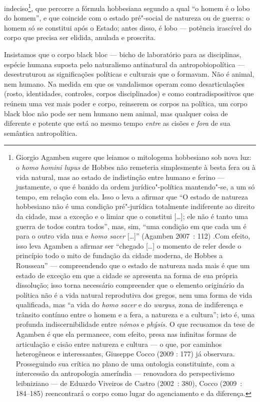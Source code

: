 indeciso\footnote{Giorgio Agamben sugere que leiamos o
  mitologema hobbesiano sob nova luz: o \emph{homo homini lupus} de
  Hobbes não remeteria simplesmente à besta fera ou à vida natural, mas
  ao estado de indistinção entre humano e ferino --- justamente, o que é
  banido da ordem jurídico"-política mantendo"-se, a um só tempo, em
  relação com ela. Isso o leva a afirmar que ``O estado de natureza
  hobbesiano não é uma condição pré"-jurídica totalmente indiferente ao
  direito da cidade, mas a exceção e o limiar que o constitui {[}\ldots{}{]};
  ele não é tanto uma guerra de todos contra todos'', mas, sim, ``uma
  condição em que cada um é para o outro vida nua e \emph{homo sacer
  }{[}\ldots{}{]}'' (Agamben 2007~: 112) .Com efeito, isso leva Agamben a
  afirmar ser ``chegado {[}\ldots{}{]} o momento de reler desde o princípio
  todo o mito de fundação da cidade moderna, de Hobbes a Rousseau'' ---
  compreendendo que o estado de natureza nada mais é que um estado de
  exceção em que a cidade se apresenta na forma de sua própria
  dissolução; isso torna necessário compreender que o elemento
  originário da política não é a vida natural reprodutiva dos gregos,
  nem uma forma de vida qualificada, mas ``a vida do \emph{homo sacer} e
  do \emph{wargus}, zona de indiferença e trânsito contínuo entre o
  homem e a fera, a natureza e a cultura''; isto é, uma profunda
  indiscernibilidade entre \emph{nómos} e \emph{phýsis.} O que recusamos
  da tese de Agamben é que ela permanece, com efeito, presa nas
  infinitas formas de articulação e cisão entre natureza e cultura --- o
  que, por caminhos heterogêneos e interessantes, Giuseppe Cocco (2009 :
  177) já observara. Prosseguindo sua crítica no plano de uma ontologia
  constituinte, com a intercessão da antropologia ameríndia ---
  renovadora do perspectivismo leibniziano --- de Eduardo Viveiros de
  Castro (2002~: 380), Cocco (2009~: 184--185) reencontrará o corpo como
  lugar do agenciamento e da diferença.}, que percorre a fórmula
hobbesiana segundo a qual ``o homem é o lobo do homem'', e que coincide
com o estado pré"-social de natureza ou de guerra: o homem só se
constitui após o Estado; antes disso, é lobo --- potência irascível do
corpo que precisa ser elidida, anulada e proscrita.

Insistamos que o corpo black bloc --- bicho de laboratório para as
disciplinas, espécie humana suposta pelo naturalismo antinatural da
antropobiopolítica --- desestruturou as significações políticas e
culturais que o formavam. Não é animal, nem humano. Na medida em que os
vandalismos operam como desarticulações (rosto, identidades, controles,
corpos disciplinados) e como contradispositivos que reúnem uma vez mais
poder e corpo, reinserem os corpos na política, um corpo black bloc não
pode ser nem humano nem animal, mas qualquer coisa de diferente e
potente que está ao mesmo tempo \emph{entre }as cisões e
\emph{fora }de sua semântica antropolítica.

